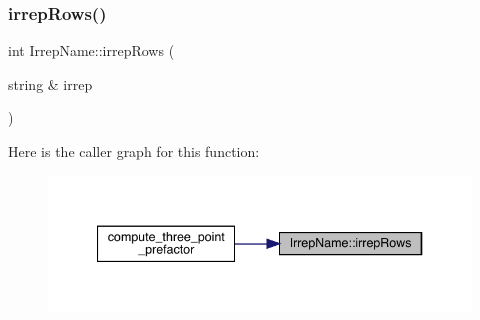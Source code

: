 \subsubsection{\texorpdfstring{irrepRows()}{irrepRows()}}
{\footnotesize\ttfamily int Irrep\+Name\+::irrep\+Rows (\begin{DoxyParamCaption}\item[{string \&}]{irrep }\end{DoxyParamCaption})}

Here is the caller graph for this function\+:\nopagebreak
\begin{figure}[H]
\begin{center}
\leavevmode
\includegraphics[width=340pt]{d8/dcc/namespaceIrrepName_a3964736788de2a425b5a41ff069f907b_icgraph}
\end{center}
\end{figure}
